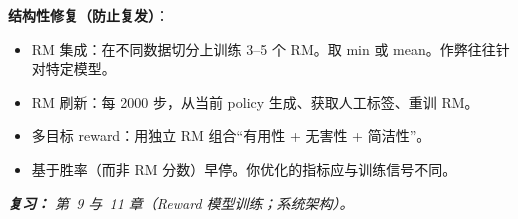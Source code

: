 \begin{questionbox}
\textbf{结构性修复（防止复发）}：

\begin{itemize}
  \item RM 集成：在不同数据切分上训练 3--5 个 RM。取 min 或 mean。作弊往往针对特定模型。
  \item RM 刷新：每 2000 步，从当前 policy 生成、获取人工标签、重训 RM。
  \item 多目标 reward：用独立 RM 组合“有用性 + 无害性 + 简洁性”。
  \item 基于胜率（而非 RM 分数）早停。你优化的指标应与训练信号不同。
\end{itemize}

\emph{\textbf{复习：} 第~9 与~11 章（Reward 模型训练；系统架构）。}
\end{questionbox}

